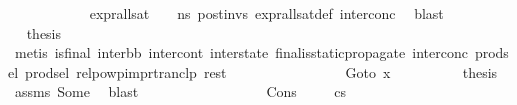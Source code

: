 \begin{isabellebody}
\ \ \ \ \ \ \ \ \ \ \isamarkupfalse%
\ {\isacartoucheopen}{\isacharparenleft}{\kern0pt}expr{\isacharunderscore}{\kern0pt}all{\isacharunderscore}{\kern0pt}sat\ {\isasymLambda}\ {\isasymGamma}\ {\isasymOmega}\ ns{}{\isacharparenright}{\kern0pt}\ post{\isacharunderscore}{\kern0pt}invs{\isacartoucheclose}\ expr{\isacharunderscore}{\kern0pt}all{\isacharunderscore}{\kern0pt}sat{\isacharunderscore}{\kern0pt}def\ inter{\isacharunderscore}{\kern0pt}conc\ \isamarkupfalse%
\ blast\isanewline
\ \ \ \ \ \ \ \ \isamarkupfalse%
\ \isamarkupfalse%
\ {\isacharquery}{\kern0pt}thesis\isanewline
\ \ \ \ \ \ \ \ \ \ \isamarkupfalse%
\ {\isacharparenleft}{\kern0pt}metis\ {\isacartoucheopen}is{\isacharunderscore}{\kern0pt}final\ {\isacharparenleft}{\kern0pt}inter{\isacharunderscore}{\kern0pt}bb{\isacharcomma}{\kern0pt}\ inter{\isacharunderscore}{\kern0pt}cont{\isacharcomma}{\kern0pt}\ inter{\isacharunderscore}{\kern0pt}state{\isacharparenright}{\kern0pt}{\isacartoucheclose}\ final{\isacharunderscore}{\kern0pt}is{\isacharunderscore}{\kern0pt}static{\isacharunderscore}{\kern0pt}propagate\ inter{\isacharunderscore}{\kern0pt}conc\ prod{\isachardot}{\kern0pt}sel{\isacharparenleft}{\kern0pt}{}{\isacharparenright}{\kern0pt}\ prod{\isachardot}{\kern0pt}sel{\isacharparenleft}{\kern0pt}{}{\isacharparenright}{\kern0pt}\ relpowp{\isacharunderscore}{\kern0pt}imp{\isacharunderscore}{\kern0pt}rtranclp\ rest{}{\isacharparenright}{\kern0pt}\isanewline
\ \ \ \ \ \ \isamarkupfalse%
\isanewline
\ \ \ \ \ \ \ \ \isamarkupfalse%
\ {\isacharparenleft}{\kern0pt}Goto\ x{}{\isacharparenright}{\kern0pt}\isanewline
\ \ \ \ \ \ \ \ \isamarkupfalse%
\ {\isacharquery}{\kern0pt}thesis\ \isamarkupfalse%
\ assms{\isacharparenleft}{\kern0pt}{}{\isacharparenright}{\kern0pt}\ Some\ \isamarkupfalse%
\ blast\isanewline
\ \ \ \ \ \ \isamarkupfalse%
\isanewline
\ \ \ \ \isamarkupfalse%
\isanewline
\ \ \isamarkupfalse%
\isanewline
{}\isamarkupfalse%
\isanewline
\ \ \isamarkupfalse%
\ {\isacharparenleft}{\kern0pt}Cons{\isacharparenright}{\kern0pt}\ \isanewline
\ \ \isamarkupfalse%
\ {\isachardoublequoteopen}cs{}\ {\isasymnoteq}\ {\isacharbrackleft}{\kern0pt}{\isacharbrackright}{\kern0pt}{\isachardoublequoteclose}\ \isamarkupfalse%

\end{isabellebody}
